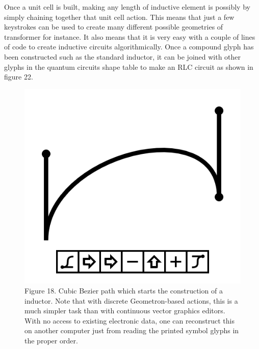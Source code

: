 \documentclass[11pt]{article}
\begin{document}
    Once a unit cell is built, making any length of inductive element is possibly by simply chaining together that unit cell action.  This means that just a few keystrokes can be used to create many different possible geometries of transformer for instance.  It also means that it is very easy with a couple of lines of code to create inductive circuits algorithmically. Once a compound glyph has been constructed such as the standard inductor, it can be joined with other glyphs in the quantum circuits shape table to make an RLC circuit as shown in figure 22.  


\begin{figure}

\includegraphics[width=\linewidth]{figures/figure18_coilBezier1.png}

\caption{Figure 18. Cubic Bezier path which starts the construction of a inductor.  Note that with discrete Geometron-based actions, this is a much simpler task than with continuous vector graphics editors.  With no access to existing electronic data, one can reconstruct this on another computer just from reading the printed symbol glyphs in the proper order.}
\end{figure}
\end{document}
